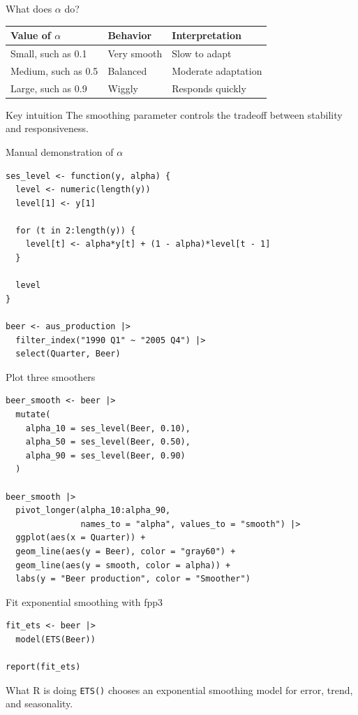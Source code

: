 \documentclass[aspectratio=169,11pt]{beamer}
\begin{document}
\begin{frame}{What does \(\alpha\) do?}
\begin{center}
\begin{tabular}{lll}
\toprule
Value of \(\alpha\) & Behavior & Interpretation \\
\midrule
Small, such as 0.1 & Very smooth & Slow to adapt \\
Medium, such as 0.5 & Balanced & Moderate adaptation \\
Large, such as 0.9 & Wiggly & Responds quickly \\
\bottomrule
\end{tabular}
\end{center}

\vspace{0.4cm}
\begin{block}{Key intuition}
The smoothing parameter controls the tradeoff between stability and responsiveness.
\end{block}
\end{frame}

\begin{frame}[fragile]{Manual demonstration of \(\alpha\)}
\begin{lstlisting}
ses_level <- function(y, alpha) {
  level <- numeric(length(y))
  level[1] <- y[1]

  for (t in 2:length(y)) {
    level[t] <- alpha*y[t] + (1 - alpha)*level[t - 1]
  }

  level
}

beer <- aus_production |>
  filter_index("1990 Q1" ~ "2005 Q4") |>
  select(Quarter, Beer)
\end{lstlisting}
\end{frame}

\begin{frame}[fragile]{Plot three smoothers}
\begin{lstlisting}
beer_smooth <- beer |>
  mutate(
    alpha_10 = ses_level(Beer, 0.10),
    alpha_50 = ses_level(Beer, 0.50),
    alpha_90 = ses_level(Beer, 0.90)
  )

beer_smooth |>
  pivot_longer(alpha_10:alpha_90,
               names_to = "alpha", values_to = "smooth") |>
  ggplot(aes(x = Quarter)) +
  geom_line(aes(y = Beer), color = "gray60") +
  geom_line(aes(y = smooth, color = alpha)) +
  labs(y = "Beer production", color = "Smoother")
\end{lstlisting}
\end{frame}

\begin{frame}[fragile]{Fit exponential smoothing with fpp3}
\begin{lstlisting}
fit_ets <- beer |>
  model(ETS(Beer))

report(fit_ets)
\end{lstlisting}

\vspace{0.4cm}
\begin{block}{What R is doing}
\texttt{ETS()} chooses an exponential smoothing model for error, trend, and seasonality.
\end{block}
\end{frame}
\end{document}
